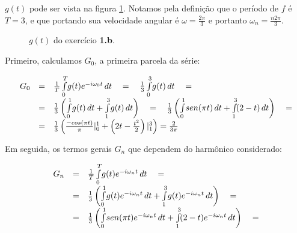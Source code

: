 $g(t)$ pode ser vista na figura \ref{fig:1b-g}. Notamos pela definição que o período de $f$ é $T = 3$, e que portando sua velocidade angular é $\omega = \frac{2\pi}{3}$ e portanto $\omega_n = \frac{n2\pi}{3}$.

\begin{figure}
  \caption{\small{$g(t)$ do exercício \textbf{1.b}.}}
  \label{fig:1b-g}
\end{figure}

Primeiro, calculamos $G_0$, a primeira parcela da série:

\[\displaystyle
\begin{array}{l c l}
  G_0 & = & \frac{1}{T} \int\limits_0^T \! g(t) e^{-i \omega_0 t} \, dt \quad = \quad \frac{1}{3} \int\limits_0^3 \! g(t) \, dt  \quad = \\
      & = & \frac{1}{3} \left( \int\limits_0^1 \! g(t) \, dt + \int\limits_1^3 \! g(t) \, dt  \right) \quad = \quad \frac{1}{3} \left( \int\limits_0^1 \! sen(\pi t) \, dt + \int\limits_1^3 \! (2-t) \, dt \right) \quad  = \\
      & = & \frac{1}{3} \left( \frac{-cos(\pi t)}{\pi} |_0^1 + \left( 2t - \frac{t^2}{2} \right)|_1^3 \right)  = \frac{2}{3 \pi}\\
\end{array}
\]

Em seguida, os termos gerais $G_n$ que dependem do harmônico considerado:

\[\displaystyle
\begin{array}{l c l}
  G_n & = & \frac{1}{T} \int\limits_0^T \! g(t) e^{-i \omega_n t} \, dt \quad = \\
      & = & \frac{1}{3} \left( \int\limits_0^1 \! g(t) e^{-i \omega_n t} \, dt + \int\limits_1^3 \! g(t) e^{-i \omega_n t} \, dt  \right) \quad = \\
      & = & \frac{1}{3} \left( \int\limits_0^1 \! sen(\pi t) e^{-i \omega_n t} \, dt + \int\limits_1^3 \! (2-t) e^{-i \omega_n t} \, dt \right) \quad  = \\
\end{array}
\]

